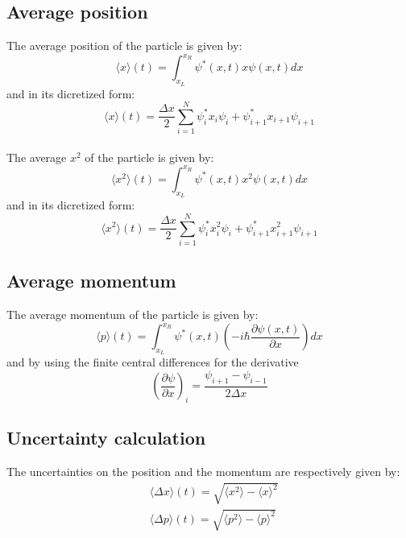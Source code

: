 \documentclass[a4paper,12pt,twoside]{article}
\begin{document}
  \subsection{Average position}
  The average position of the particle is given by:
  \begin{equation}
   \langle x \rangle(t) = \int_{x_L}^{x_R}\psi^*(x,t)x\psi(x,t)dx
  \end{equation}
  and in its dicretized form:
  \begin{equation}
   \langle x \rangle(t) = \frac{\Delta x}{2} \sum_{i=1}^{N} \psi_i^*x_i\psi_i + \psi_{i+1}^*x_{i+1}\psi_{i+1}
  \end{equation}\\
  The average $x^2$ of the particle is given by:
  \begin{equation}
   \langle x^2 \rangle(t) = \int_{x_L}^{x_R}\psi^*(x,t)x^2\psi(x,t)dx
  \end{equation}
  and in its dicretized form:
  \begin{equation}
   \langle x^2 \rangle(t) = \frac{\Delta x}{2} \sum_{i=1}^{N} \psi_i^*x_i^2\psi_i + \psi_{i+1}^*x_{i+1}^2\psi_{i+1}
  \end{equation}
  
  \subsection{Average momentum}
  The average momentum of the particle is given by:
  \begin{equation}
   \langle p \rangle(t) = \int_{x_L}^{x_R}\psi^*(x,t)\left(-i\hbar\frac{\partial\psi(x,t)}{\partial x}\right)dx
  \end{equation}
  and by using the finite central differences for the derivative
  \begin{equation*}
   \left(\frac{\partial\psi}{\partial x}\right)_i = \frac{\psi_{i+1}-\psi_{i-1}}{2\Delta x}
  \end{equation*}%
  
  \subsection{Uncertainty calculation}
  The uncertainties on the position and the momentum are respectively given by:
  \begin{align}
   &\langle \Delta x\rangle(t) = \sqrt{\langle x^2 \rangle - \langle x \rangle^2}\\
   &\langle \Delta p\rangle(t) = \sqrt{\langle p^2 \rangle - \langle p \rangle^2}
  \end{align}
\end{document}
